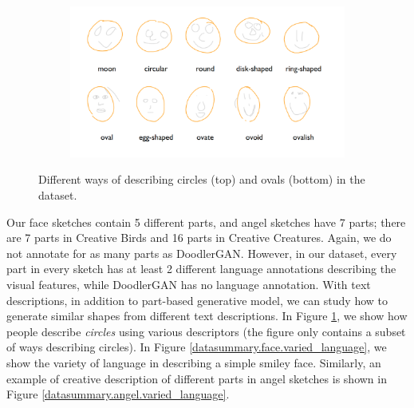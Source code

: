 \begin{figure}[!htb]
\begin{subfigure}{\textwidth}
\centering
\includegraphics[width=\linewidth]{data_collection/summary/circles_descriptions.png}  
\end{subfigure}
\caption{Different ways of describing circles (top) and ovals (bottom) in the dataset.}
\label{datasummary.circles.varied_language}
\end{figure}

Our face sketches contain 5 different parts, and angel sketches have 7 parts; there are 7 parts in Creative Birds and 16 parts in Creative Creatures. Again, we do not annotate for as many parts as DoodlerGAN. 
However, in our dataset, every part in every sketch has at least 2 different language annotations describing the visual features, while DoodlerGAN has no language annotation. 
With text descriptions, in addition to part-based generative model, we can study how to generate similar shapes from different text descriptions. In Figure \ref{datasummary.circles.varied_language}, we show how people describe \textit{circles} using various descriptors (the figure only contains a subset of ways describing circles).  
In Figure \ref{datasummary.face.varied_language}, we show the variety of language in describing a simple smiley face. Similarly, an example of creative description of different parts in angel sketches is shown in Figure \ref{datasummary.angel.varied_language}.  



